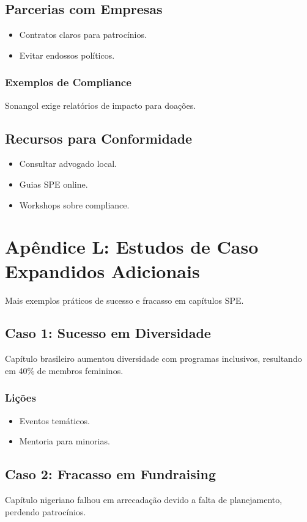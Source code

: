 \documentclass[12pt]{article}
\begin{document}
\subsection{Parcerias com Empresas}
\begin{itemize}
    \item Contratos claros para patrocínios.
    \item Evitar endossos políticos.
\end{itemize}

\subsubsection{Exemplos de Compliance}
Sonangol exige relatórios de impacto para doações.

\subsection{Recursos para Conformidade}
\begin{itemize}
    \item Consultar advogado local.
    \item Guias SPE online.
    \item Workshops sobre compliance.
\end{itemize}

\clearpage
\section{Apêndice L: Estudos de Caso Expandidos Adicionais}

Mais exemplos práticos de sucesso e fracasso em capítulos SPE.

\subsection{Caso 1: Sucesso em Diversidade}
Capítulo brasileiro aumentou diversidade com programas inclusivos, resultando em 40\% de membros femininos.

\subsubsection{Lições}
\begin{itemize}
    \item Eventos temáticos.
    \item Mentoria para minorias.
\end{itemize}

\subsection{Caso 2: Fracasso em Fundraising}
Capítulo nigeriano falhou em arrecadação devido a falta de planejamento, perdendo patrocínios.
\end{document}
